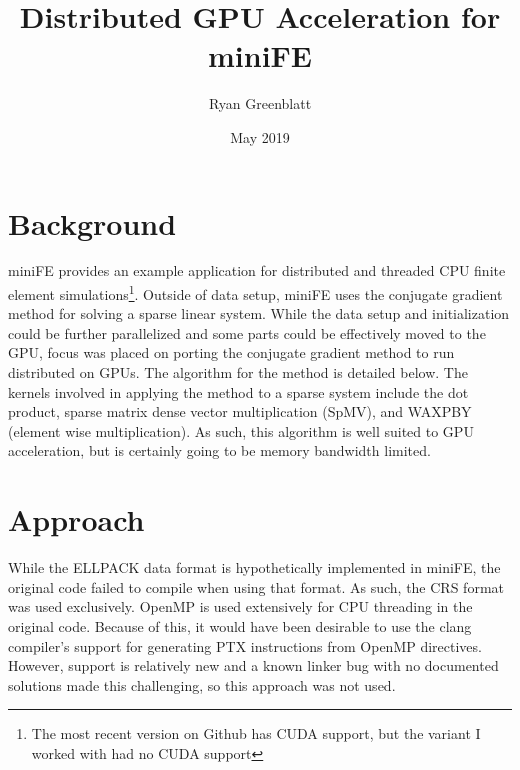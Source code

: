 \documentclass{article}
\title{Distributed GPU Acceleration for miniFE}
\author{Ryan Greenblatt}
\date{May 2019}
\begin{document}
\setlength\parindent{0pt}

\renewcommand{\thesubsection}{\alph{subsection}}

\maketitle

\section{Background}

miniFE provides an example application for distributed and threaded CPU finite
element simulations\footnote{The most recent version on Github has CUDA
support, but the variant I worked with had no CUDA support}. Outside of data
setup, miniFE uses the conjugate gradient method for solving a sparse linear
system. While the data setup and initialization could be further parallelized
and some parts could be effectively moved to the GPU, focus was placed on
porting the conjugate gradient method to run distributed on GPUs. The algorithm
for the method is detailed below. The kernels involved in applying the method
to a sparse system include the dot product, sparse matrix dense vector
multiplication (SpMV), and WAXPBY (element wise multiplication). As such, this
algorithm is well suited to GPU acceleration, but is certainly going to
be memory bandwidth limited.

\begin{algorithm}
  \begin{algorithmic}[1]
    \State $r_0 \gets b - A x$
    \State $r_1 \gets r_0$
    \State $p \gets r_0$
    \State $i \gets 1$
  $}
    \State $p \gets r_i + \frac{\Vert r_i \Vert_2^2}{\Vert r_{i-1} \Vert_2^2} p$
    \State $\alpha \gets \frac{\Vert r_i \Vert_2^2}{\langle A p,  p\rangle}$
    \State $x \gets x + \alpha p$
    \State $r_{i+1} \gets r_i + \alpha A p$
    \State $i \gets i + 1$
    \EndWhile
    \EndProcedure
  \end{algorithmic}
\end{algorithm}

\section{Approach}

While the ELLPACK data format is hypothetically implemented in miniFE, the
original code failed to compile when using that format. As such, the CRS format
was used exclusively. OpenMP is used extensively for CPU threading in the
original code. Because of this, it would have been desirable to use the clang
compiler's support for generating PTX instructions from OpenMP directives.
However, support is relatively new and a known linker bug with no documented
solutions made this challenging, so this approach was not used.  \\
\end{document}
